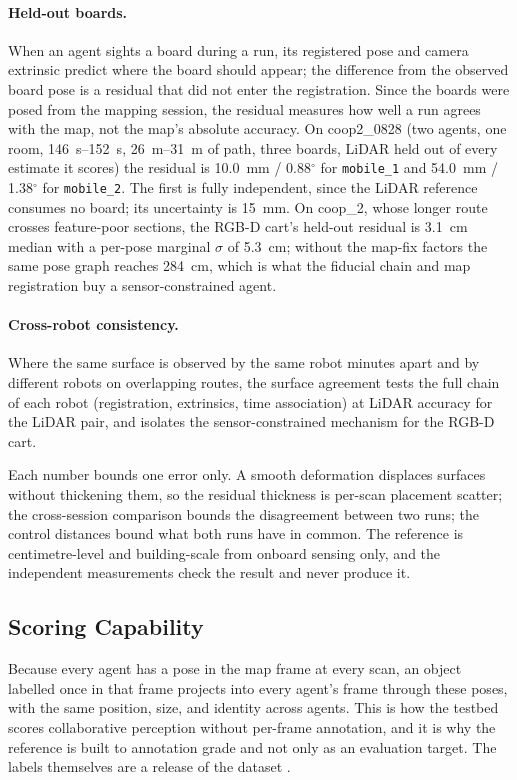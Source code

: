 \paragraph{Held-out boards.} When an agent sights a board during a
run, its registered pose and camera extrinsic predict where the board
should appear; the difference from the observed board pose is a
residual that did not enter the registration. Since the boards were
posed from the mapping session, the residual measures how well a run
agrees with the map, not the map's absolute accuracy. On coop2\_0828 (two
agents, one room, \SIrange{146}{152}{\second}, \SIrange{26}{31}{\metre}
of path, three boards, LiDAR held out of every estimate it scores) the
residual is \SI{10.0}{\milli\metre} / 0.88$^\circ$ for
\texttt{mobile\_1} and \SI{54.0}{\milli\metre} / 1.38$^\circ$ for
\texttt{mobile\_2}. The first is fully independent, since the LiDAR
reference consumes no board; its uncertainty is \SI{15}{\milli\metre}.
On coop\_2, whose longer route crosses feature-poor sections, the
RGB-D cart's held-out residual is \SI{3.1}{\centi\metre} median with a
per-pose marginal $\sigma$ of \SI{5.3}{\centi\metre}; without the
map-fix factors the same pose graph reaches \SI{284}{\centi\metre},
which is what the fiducial chain and map registration buy a
sensor-constrained agent. 

\paragraph{Cross-robot consistency.} Where the same surface is observed
by the same robot minutes apart and by different robots on overlapping
routes, the surface agreement tests the full chain of each robot
(registration, extrinsics, time association) at LiDAR accuracy for the
LiDAR pair, and isolates the sensor-constrained mechanism for the
RGB-D cart. 



Each number bounds one error only. A smooth deformation displaces
surfaces without thickening them, so the residual thickness is
per-scan placement scatter; the cross-session comparison bounds the
disagreement between two runs; the control distances bound what both
runs have in common. The reference is centimetre-level and
building-scale from onboard sensing only, and the independent
measurements check the result and never produce it.

\subsection{Scoring Capability}
\label{sec:gt_score}
Because every agent has a pose in the map frame at every scan, an
object labelled once in that frame projects into every agent's frame
through these poses, with the same position, size, and identity across
agents. This is how the testbed scores collaborative perception
without per-frame annotation, and it is why the reference is built to
annotation grade and not only as an evaluation target. The labels
themselves are a release of the dataset \cite{scoop_dataset}.
